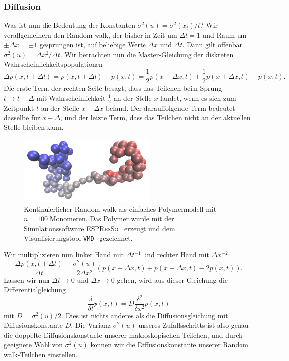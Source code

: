 \subsubsection{Diffusion}

Was ist nun die Bedeutung der Konstanten $\sigma^2(u) =
\sigma^2(x_t)/t$?  Wir verallgemeinern den Random walk, der bisher in
Zeit um $\Delta t=1$ und Raum um $\pm\Delta x = \pm 1$ gesprungen ist,
auf beliebige Werte $\Delta x$ und $\Delta t$. Dann gilt offenbar $
\sigma^2(u) = \Delta x^2/\Delta t$. Wir betrachten nun die
Master-Gleichung der diskreten Wahrscheinlichkeitspopulationen
\begin{equation}
  \Delta p(x, t + \Delta t) = p(x, t + \Delta t) - p(x, t) =
  \frac{1}{2}p(x - \Delta x, t) +
  \frac{1}{2}p(x + \Delta x, t) - p(x, t).
\end{equation}
Die erste Term der rechten Seite besagt, dass das Teilchen beim Sprung
$t\to t +\Delta$ mit Wahrscheinlichkeit $\frac{1}{2}$ an der Stelle
$x$ landet, wenn es sich zum Zeitpunkt $t$ an der Stelle $x-\Delta x$
befand. Der darauffolgende Term bedeutet dasselbe für $x+\Delta$, und
der letzte Term, dass das Teilchen nicht an der aktuellen Stelle
bleiben kann.

\begin{figure}
  \centering
  \includegraphics[width=0.6\textwidth]{plots/polymer}
  \caption{Kontinuierlicher Random walk als einfaches Polymermodell mit
    $n=100$ Monomeren. Das Polymer wurde mit der Simulationssoftware
    \textsc{ESPResSo}~\cite{espresso} erzeugt und dem
    Visualisierungstool \texttt{VMD}~\cite{vmd} gezeichnet.}
  \label{fig:contrw}
\end{figure}

Wir multiplizieren nun linker Hand mit $\Delta t^{-1}$ und rechter Hand mit
$\Delta x^{-2}$:
\begin{equation}
  \frac{\Delta p(x, t + \Delta t)}{\Delta t} =
  \frac{\sigma^2(u)}{2\Delta x^2} \left(p(x - \Delta x, t) +
    p(x + \Delta x, t) - 2 p(x, t)\right).
\end{equation}
Lassen wir nun $\Delta t\to 0$ und $\Delta x\to 0$ gehen, wird aus
dieser Gleichung die Differentialgleichung
\begin{equation}
  \frac{\delta}{\delta t} p(x, t) =
  D\frac{\delta^2}{\delta x^2} p(x, t)
\end{equation}
mit $D=\sigma^2(u)/2$.  Dies ist nichts anderes als die
Diffusionsgleichung mit Diffusionskonstante $D$. Die Varianz
$\sigma^2(u)$ unseres Zufallsschritts ist also genau die doppelte
Diffusionskonstante unserer makroskopischen Teilchen, und durch
geeignete Wahl von $\sigma^2(u)$ können wir die Diffusionskonstante
unserer Random walk-Teilchen einstellen.

